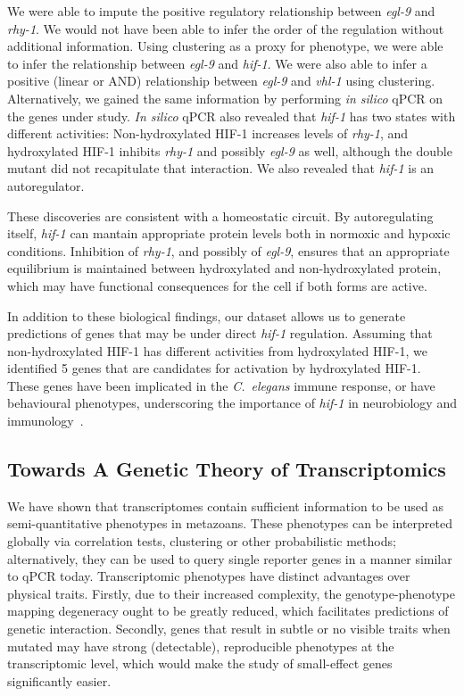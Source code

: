 \documentclass[9pt,twocolumn,twoside]{pnas-new}
\newcommand{\cel}{\emph{C.~elegans}}
\newcommand{\egl}{\emph{egl-9}}
\newcommand{\rhy}{\emph{rhy-1}}
\newcommand{\vhl}{\emph{vhl-1}}
\newcommand{\hif}{\emph{hif-1}}
\newcommand{\hifp}{HIF-1}
\begin{document}
We were able to impute the positive regulatory relationship between \egl{} and \rhy{}. We would not have been able to infer the order of the regulation without additional information. Using clustering as a proxy for phenotype, we were able to infer the relationship between \egl{} and \hif{}. We were also able to infer a positive (linear or AND) relationship between \egl{} and \vhl{} using clustering. Alternatively, we gained the same information by performing \emph{in silico} qPCR on the genes under study. \emph{In silico} qPCR also revealed that \hif{} has two states with different activities: Non-hydroxylated \hifp{} increases levels of \rhy{}, and hydroxylated \hifp{} inhibits \rhy{} and possibly \egl{} as well, although the double mutant did not recapitulate that interaction. We also revealed that \hif{} is an autoregulator.

These discoveries are consistent with a homeostatic circuit. By autoregulating itself, \hif{} can mantain appropriate protein levels both in normoxic and hypoxic conditions. Inhibition of \rhy{}, and possibly of \egl{}, ensures that an appropriate equilibrium is maintained between hydroxylated and non-hydroxylated protein, which may have functional consequences for the cell if both forms are active.

In addition to these biological findings, our dataset allows us to generate predictions of genes that may be under direct \hif{} regulation. Assuming that non-hydroxylated \hifp{} has different activities from hydroxylated \hifp{}, we identified 5 genes that are candidates for activation by hydroxylated \hifp{}. These genes have been implicated in the \cel{} immune response, or have behavioural phenotypes, underscoring the importance of \hif{} in neurobiology and immunology~\cite{Gray2004,Cheung2005,Chang2008,Ma2013}.

\subsection{Towards A Genetic Theory of Transcriptomics}
We have shown that transcriptomes contain sufficient information to be used as semi-quantitative phenotypes in metazoans. These phenotypes can be interpreted globally via correlation tests, clustering or other probabilistic methods; alternatively, they can be used to query single reporter genes in a manner similar to qPCR today. Transcriptomic phenotypes have distinct advantages over physical traits.
Firstly, due to their increased complexity, the genotype-phenotype mapping degeneracy ought to be greatly reduced, which facilitates predictions of genetic interaction. Secondly, genes that result in subtle or no visible traits when mutated may have strong (detectable), reproducible phenotypes at the transcriptomic level, which would make the study of small-effect genes significantly easier.
\end{document}
